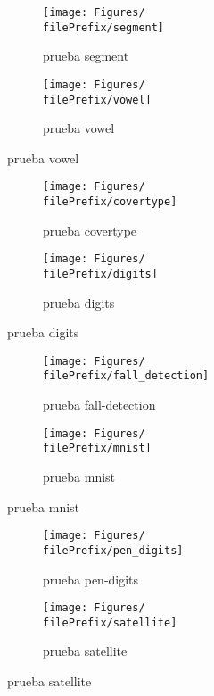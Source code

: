 \begin{figure}[ht]
  \centering
  \begin{subfigure}[b]{0.5\linewidth}
    \centering\texttt{[image: Figures/\\filePrefix/segment]}
    \caption{prueba segment}
    \label{fig:\undPrefix_segment}
  \end{subfigure}%
  \begin{subfigure}[b]{0.5\linewidth}
    \centering\texttt{[image: Figures/\\filePrefix/vowel]}
    \caption{prueba vowel}
    \label{fig:\undPrefix_vowel}
  \end{subfigure}
\end{figure}


\renewcommand{\filePrefix}{\undPrefix/nys}
\begin{figure}[ht]
  \centering
  \begin{subfigure}[b]{0.5\linewidth}
    \centering\texttt{[image: Figures/\\filePrefix/covertype]}
    \caption{prueba covertype}
    \label{fig:\undPrefix_covertype}
  \end{subfigure}%
  \begin{subfigure}[b]{0.5\linewidth}
    \centering\texttt{[image: Figures/\\filePrefix/digits]}
    \caption{prueba digits}
    \label{fig:\undPrefix_digits}
  \end{subfigure}
\end{figure}


\begin{figure}[ht]
  \centering
  \begin{subfigure}[b]{0.5\linewidth}
    \centering\texttt{[image: Figures/\\filePrefix/fall\_detection]}
    \caption{prueba fall-detection}
    \label{fig:\undPrefix_fall_detection}
  \end{subfigure}%
  \begin{subfigure}[b]{0.5\linewidth}
    \centering\texttt{[image: Figures/\\filePrefix/mnist]}
    \caption{prueba mnist}
    \label{fig:\undPrefix_mnist}
  \end{subfigure}
\end{figure}


\begin{figure}[ht]
  \centering
  \begin{subfigure}[b]{0.5\linewidth}
    \centering\texttt{[image: Figures/\\filePrefix/pen\_digits]}
    \caption{prueba pen-digits}
    \label{fig:\undPrefix_pen_digits}
  \end{subfigure}%
  \begin{subfigure}[b]{0.5\linewidth}
    \centering\texttt{[image: Figures/\\filePrefix/satellite]}
    \caption{prueba satellite}
    \label{fig:\undPrefix_satellite}
  \end{subfigure}
\end{figure}

